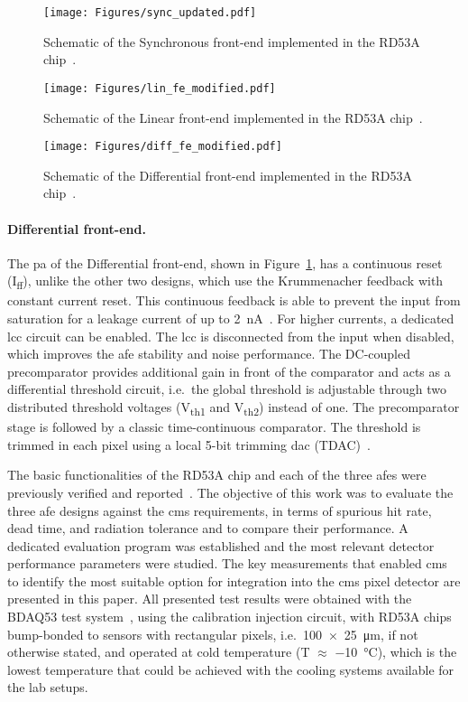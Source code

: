 \begin{figure}[p]
    \centering
    \texttt{[image: Figures/sync\_updated.pdf]}
    \caption{Schematic of the Synchronous front-end implemented in the RD53A chip~\citep{rd53a_manual}.}
    \label{fig:sync}
    \vspace{0.5cm} 
    \texttt{[image: Figures/lin\_fe\_modified.pdf]}
    \caption{Schematic of the Linear front-end implemented in the RD53A chip~\citep{rd53a_manual}.}
    \label{fig:lin}
    \vspace{0.5cm} 
    \texttt{[image: Figures/diff\_fe\_modified.pdf]}
    \caption{Schematic of the Differential front-end implemented in the RD53A chip~\citep{rd53a_manual}.}
    \label{fig:diff}
\end{figure}


\paragraph{Differential front-end.}
The \gls{pa} of the Differential front-end, shown in Figure~\ref{fig:diff}, has a continuous reset (I\textsubscript{ff}), unlike the other two designs, which use the Krummenacher feedback with constant current reset. This continuous feedback is able to prevent the input from saturation for a leakage current of up to \SI{2}{\nano\ampere}~\cite{rd53b_manual}. For higher currents, a dedicated \gls{lcc} circuit can be enabled. The \gls{lcc} is disconnected from the input when disabled, which improves the \gls{afe} stability and noise performance. The DC-coupled precomparator provides additional gain in front of the comparator and acts as a differential threshold circuit, i.e.~the global threshold is adjustable through two distributed threshold voltages (V\textsubscript{th1} and V\textsubscript{th2}) instead of one. The precomparator stage is followed by a classic time-continuous  comparator. The threshold is trimmed in each pixel using a local 5-bit trimming \gls{dac} (TDAC)~\citep{rd53a_manual}.



{The basic functionalities of the RD53A chip and each of the three \gls{afe}s were previously verified and reported~\citep{timon_hiroshima, luigi_vertex, aleksandra_vci, ennio_twepp, luigi_nima}. The objective of this work was to evaluate the three \gls{afe} designs against the \gls{cms} requirements, in terms of spurious hit rate, dead time, and radiation tolerance and to compare their performance.
A dedicated evaluation program was established and the most relevant detector performance parameters were studied. The key measurements that enabled \gls{cms} to identify the most suitable option for integration into the \gls{cms} pixel detector are presented in this paper. All presented test results were obtained with the BDAQ53 test system~\citep{bdaq53}, using the calibration injection circuit, with RD53A chips bump-bonded to sensors with rectangular pixels, i.e.~\SI[product-units = power]{100x25}{\micro\meter}, if not otherwise stated, and operated at cold temperature (T $\approx$ \SI{-10}{\celsius}), which is the lowest temperature that could be achieved with the cooling systems available for the lab setups.}